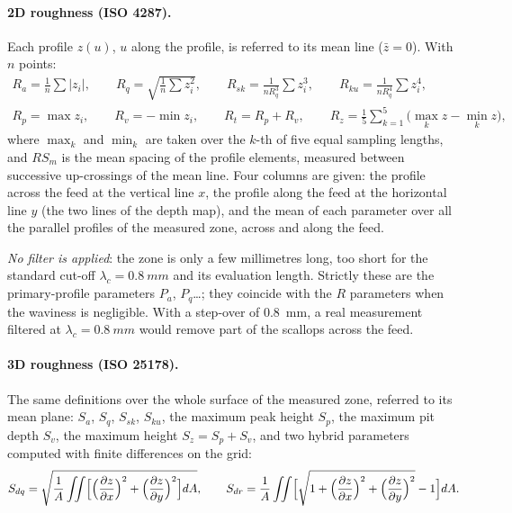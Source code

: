 \documentclass[11pt,a4paper]{article}
\begin{document}
\paragraph{2D roughness (ISO 4287).} Each profile $z(u)$, $u$ along the profile, is referred to its mean line ($\bar z=0$). With $n$ points:
\begin{gather}
R_a=\frac1n\sum|z_i|,\qquad R_q=\sqrt{\frac1n\sum z_i^2},\qquad R_{sk}=\frac{1}{nR_q^3}\sum z_i^3,\qquad R_{ku}=\frac{1}{nR_q^4}\sum z_i^4,\\
R_p=\max z_i,\qquad R_v=-\min z_i,\qquad R_t=R_p+R_v,\qquad R_z=\frac15\sum_{k=1}^{5}\bigl(\max_k z-\min_k z\bigr),
\end{gather}
where $\max_k$ and $\min_k$ are taken over the $k$-th of five equal sampling lengths, and $RS_m$ is the mean spacing of the profile elements, measured between successive up-crossings of the mean line. Four columns are given: the profile across the feed at the vertical line $x$, the profile along the feed at the horizontal line $y$ (the two lines of the depth map), and the mean of each parameter over all the parallel profiles of the measured zone, across and along the feed.

\emph{No filter is applied}: the zone is only a few millimetres long, too short for the standard cut-off $\lambda_c=\SI{0.8}{mm}$ and its evaluation length. Strictly these are the primary-profile parameters $P_a$, $P_q$\ldots; they coincide with the $R$ parameters when the waviness is negligible. With a step-over of 0.8~mm, a real measurement filtered at $\lambda_c=\SI{0.8}{mm}$ would remove part of the scallops across the feed.

\paragraph{3D roughness (ISO 25178).} The same definitions over the whole surface of the measured zone, referred to its mean plane: $S_a$, $S_q$, $S_{sk}$, $S_{ku}$, the maximum peak height $S_p$, the maximum pit depth $S_v$, the maximum height $S_z=S_p+S_v$, and two hybrid parameters computed with finite differences on the grid:
\begin{equation}
S_{dq}=\sqrt{\frac1A\iint\Bigl[\Bigl(\frac{\partial z}{\partial x}\Bigr)^2+\Bigl(\frac{\partial z}{\partial y}\Bigr)^2\Bigr]dA},\qquad
S_{dr}=\frac1A\iint\Bigl[\sqrt{1+\Bigl(\frac{\partial z}{\partial x}\Bigr)^2+\Bigl(\frac{\partial z}{\partial y}\Bigr)^2}-1\Bigr]dA .
\end{equation}
\end{document}
